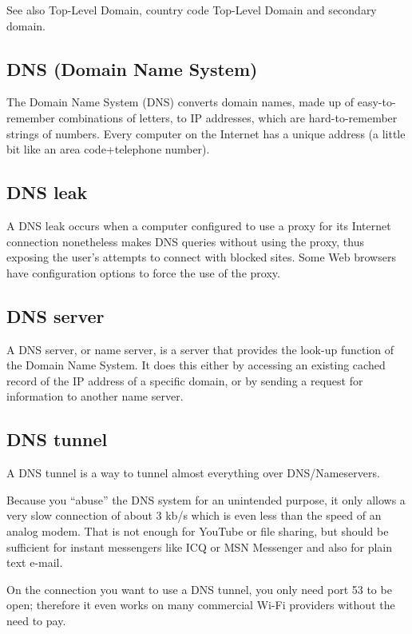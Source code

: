 See also Top-Level Domain, country code Top-Level Domain and secondary
domain.

\subsection{DNS (Domain Name System)}

The Domain Name System (DNS) converts domain names, made up of
easy-to-remember combinations of letters, to IP addresses, which are
hard-to-remember strings of numbers. Every computer on the Internet has
a unique address (a little bit like an area code+telephone number).

\subsection{DNS leak}

A DNS leak occurs when a computer configured to use a proxy for its
Internet connection nonetheless makes DNS queries without using the
proxy, thus exposing the user's attempts to connect with blocked sites.
Some Web browsers have configuration options to force the use of the
proxy.

\subsection{DNS server}

A DNS server, or name server, is a server that provides the look-up
function of the Domain Name System. It does this either by accessing an
existing cached record of the IP address of a specific domain, or by
sending a request for information to another name server.

\subsection{DNS tunnel}

A DNS tunnel is a way to tunnel almost everything over DNS/Nameservers.

Because you ``abuse'' the DNS system for an unintended purpose, it only
allows a very slow connection of about 3 kb/s which is even less than
the speed of an analog modem. That is not enough for YouTube or file
sharing, but should be sufficient for instant messengers like ICQ or MSN
Messenger and also for plain text e-mail.

On the connection you want to use a DNS tunnel, you only need port 53 to
be open; therefore it even works on many commercial Wi-Fi providers
without the need to pay.

